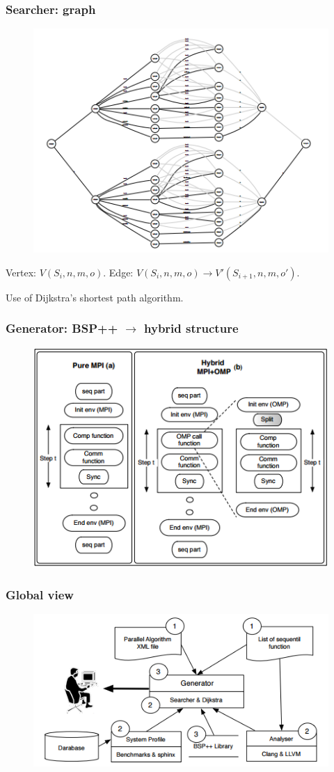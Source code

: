 \documentclass{beamer}
\begin{document}
\begin{frame}
\frametitle{Searcher: graph}

\begin{figure}
\includegraphics[width=0.5\linewidth]{generator-graph}
\end{figure}

Vertex: $V(S_{i}, n, m, o)$. Edge: $V(S_{i}, n, m, o) \rightarrow V'(S_{i+1}, n, m, o')$.

Use of Dijkstra's shortest path algorithm.

\end{frame}

\begin{frame}
\frametitle{Generator: BSP++ $\rightarrow$ hybrid structure}

\begin{figure}
\includegraphics[width=0.8\linewidth]{generator-hybrid-struct}
\end{figure}

\end{frame}


\begin{frame}
\frametitle{Global view}
\begin{figure}
\includegraphics[width=0.8\linewidth]{global-view}
\end{figure}
\end{frame}
\end{document}
